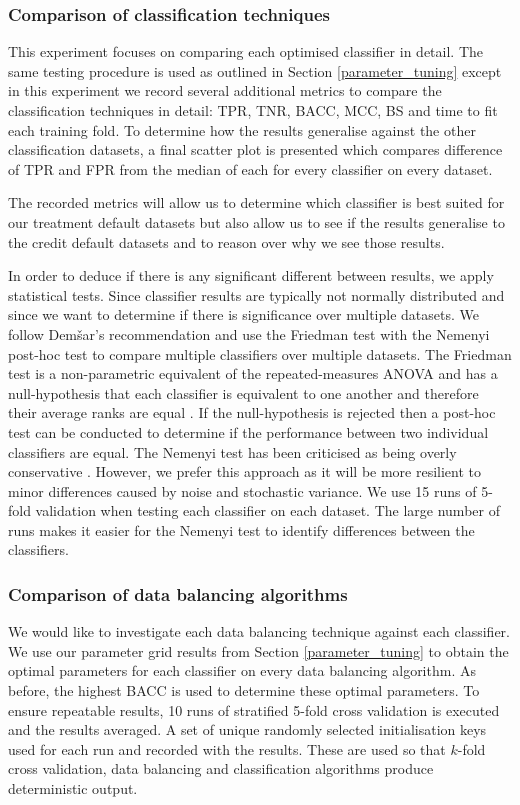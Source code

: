 \documentclass{sig-alternate-05-2015}
\begin{document}
	\subsubsection{Comparison of classification techniques}
	\label{comparision_of_classification_technique}
	This experiment focuses on comparing each optimised classifier in detail. The same testing procedure is used as outlined in Section \ref{parameter_tuning} except in this experiment we record several additional metrics to compare the classification techniques in detail: TPR, TNR, BACC, MCC, BS and time to fit each training fold. To determine how the results generalise against the other classification datasets, a final scatter plot is presented which compares difference of TPR and FPR from the median of each for every classifier on every dataset.
	
	The recorded metrics will allow us to determine which classifier is best suited for our treatment default datasets but also allow us to see if the results generalise to the credit default datasets and to reason over why we see those results.
	
	In order to deduce if there is any significant different between results, we apply statistical tests. Since classifier results are typically not normally distributed and since we want to determine if there is significance over multiple datasets. We follow Dem\v{s}ar's \cite{Demsar:2006:SCC:1248547.1248548} recommendation and use the Friedman test with the Nemenyi post-hoc test to compare multiple classifiers over multiple datasets. The Friedman test is a non-parametric equivalent of the repeated-measures ANOVA and has a null-hypothesis that each classifier is equivalent to one another and therefore their average ranks are equal \cite{Demsar:2006:SCC:1248547.1248548}. If the null-hypothesis is rejected then a post-hoc test can be conducted to determine if the performance between two individual classifiers are equal. The Nemenyi test has been criticised as being overly conservative \cite{garcia2008extension}. However, we prefer this approach as it will be more resilient to minor differences caused by noise and stochastic variance. We use 15 runs of 5-fold validation when testing each classifier on each dataset. The large number of runs makes it easier for the Nemenyi test to identify differences between the classifiers.
	
	\subsubsection{Comparison of data balancing algorithms}
	We would like to investigate each data balancing technique against each classifier. We use our parameter grid results from Section \ref{parameter_tuning} to obtain the optimal parameters for each classifier on every data balancing algorithm. As before, the highest BACC is used to determine these optimal parameters. To ensure repeatable results, 10 runs of stratified 5-fold cross validation is executed and the results averaged. A set of unique randomly selected initialisation keys used for each run and recorded with the results. These are used so that $k$-fold cross validation, data balancing and classification algorithms produce deterministic output.
	
\end{document}
